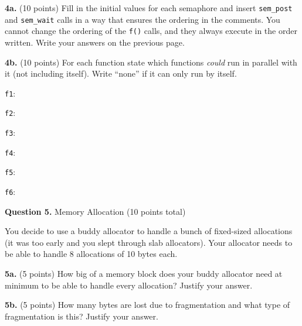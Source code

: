 \documentclass[12pt]{article}
\begin{document}
\newpage

\textbf{4a.} (10 points) Fill in the initial values for each semaphore and
insert \texttt{sem\_post} and \texttt{sem\_wait} calls in a way that ensures
the ordering in the comments.
You cannot change the ordering of the \texttt{f()} calls, and they always
execute in the order written.
Write your answers on the previous page.

\vspace{1em}

\textbf{4b.} (10 points) For each function state which functions \textit{could}
run in parallel with it (not including itself).
Write ``none'' if it can only run by itself.

\vspace{1em}

\texttt{f1}:

\vspace{3em}

\texttt{f2}:

\vspace{3em}

\texttt{f3}:

\vspace{3em}

\texttt{f4}:

\vspace{3em}

\texttt{f5}:

\vspace{3em}

\texttt{f6}:

\newpage

\textbf{Question 5.} Memory Allocation (10 points total)

\vspace{1em}

You decide to use a buddy allocator to handle a bunch of fixed-sized allocations
(it was too early and you slept through slab allocators).
Your allocator needs to be able to handle 8 allocations of 10 bytes each.

\vspace{1em}

\textbf{5a.} (5 points)
How big of a memory block does your buddy allocator need at minimum to be able
to handle every allocation?
Justify your answer.

\vspace{16em}

\textbf{5b.} (5 points)
How many bytes are lost due to fragmentation and what type of fragmentation is
this?
Justify your answer.
\end{document}
